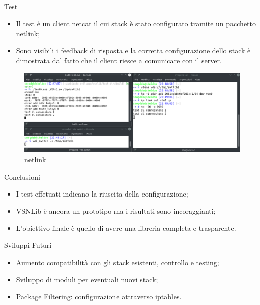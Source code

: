 \documentclass{beamer}
\begin{document}
\begin{frame}[fragile]{Test}
	\begin{itemize}
\item Il test \`e un client netcat il cui stack \`e stato configurato tramite un pacchetto netlink;\\
\item Sono visibili i feedback di risposta e la corretta configurazione dello stack \`e dimostrata dal fatto che il client riesce a comunicare con il server.
\end{itemize}
\begin{figure}[t!]
\includegraphics[scale=0.28]{img/test6_b}
\caption{netlink}
\end{figure}
\end{frame}

\begin{frame}[fragile]{Conclusioni}
 \begin{itemize}
     \item I test effetuati indicano la riuscita della configurazione;\newline
     \item VSNLib \`e ancora un prototipo ma i risultati sono incoraggianti;\newline
     \item L'obiettivo finale \`e quello di avere una libreria completa e trasparente.
 \end{itemize}
\end{frame}


\begin{frame}[fragile]{Sviluppi Futuri}
 \begin{itemize}
	 	\item Aumento compatibilit\`a con gli stack esistenti, controllo e testing;\newline
		\item Sviluppo di moduli per eventuali nuovi stack;\newline
     \item Package Filtering: configurazione attraverso iptables.
 \end{itemize}
\end{frame}
\end{document}

